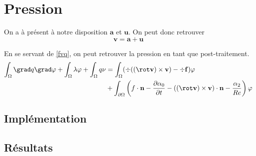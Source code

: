 \chapter{Pression}
On a à présent à notre disposition $\bm{a}$ et $\bm{u}$. On peut donc retrouver \[ \bm{v}=\bm{a}+\bm{u} \]

En se servant de \ref{fvq}, on peut retrouver la pression en tant que post-traitement.
\begin{align*}
\int_\Omega \grad q\grad\varphi + \int_\Omega \lambda\varphi + \int_\Omega q\nu &= \int_\Omega (\div((\rot \mathbf{v})\times \mathbf{v}) -\div \mathbf{f})\varphi\\
&+ \int_{\partial\Omega} \left(f\cdot \mathbf{n} - \frac{\partial\alpha_0}{\partial t} - ((\rot \mathbf{v})\times \mathbf{v})\cdot \mathbf{n} - \frac{\alpha_2}{Re}\right)\varphi
\end{align*}

\section{Implémentation}
\section{Résultats}

